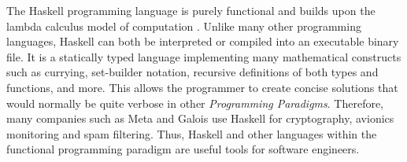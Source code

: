 The Haskell programming language is purely functional\cite{Haskell_landing} and builds upon the lambda calculus model of computation \cite{Haskell_book}.
Unlike many other programming languages, Haskell can both be interpreted or compiled into an executable binary file.
It is a statically typed language implementing many mathematical constructs such as currying, set-builder notation, recursive definitions of both types and functions, and more.
This allows the programmer to create concise solutions that would normally be quite verbose in other \textit{Programming Paradigms}. 
Therefore, many companies such as Meta and Galois use Haskell for cryptography, avionics monitoring and spam filtering\cite{Haskell_companies}.
Thus, Haskell and other languages within the functional programming paradigm are useful tools for software engineers.


